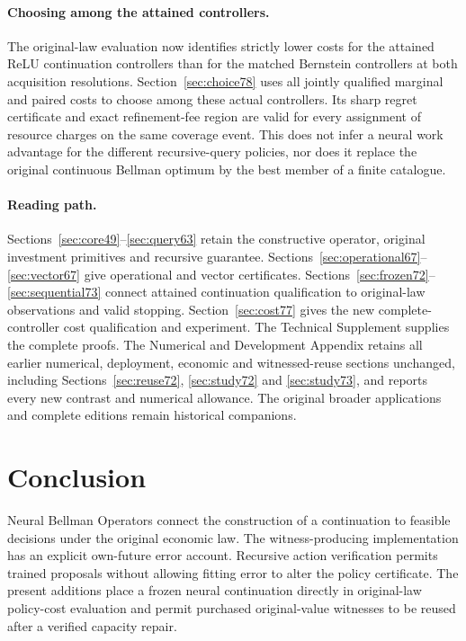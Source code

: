 \documentclass[ecta,nameyear,draft]{econsocart}
\begin{document}
\paragraph{Choosing among the attained controllers.}
The original-law evaluation now identifies strictly lower costs for the attained ReLU continuation controllers than for the matched Bernstein controllers at both acquisition resolutions. Section~\ref{sec:choice78} uses all jointly qualified marginal and paired costs to choose among these actual controllers. Its sharp regret certificate and exact refinement-fee region are valid for every assignment of resource charges on the same coverage event. This does not infer a neural work advantage for the different recursive-query policies, nor does it replace the original continuous Bellman optimum by the best member of a finite catalogue.

\paragraph{Reading path.}
Sections~\ref{sec:core49}--\ref{sec:query63} retain the constructive operator, original investment primitives and recursive guarantee. Sections~\ref{sec:operational67}--\ref{sec:vector67} give operational and vector certificates. Sections~\ref{sec:frozen72}--\ref{sec:sequential73} connect attained continuation qualification to original-law observations and valid stopping. Section~\ref{sec:cost77} gives the new complete-controller cost qualification and experiment. The Technical Supplement supplies the complete proofs. The Numerical and Development Appendix retains all earlier numerical, deployment, economic and witnessed-reuse sections unchanged, including Sections~\ref{sec:reuse72}, \ref{sec:study72} and \ref{sec:study73}, and reports every new contrast and numerical allowance. The original broader applications and complete editions remain historical companions.











\section{Conclusion}\label{sec:conclusion65}
Neural Bellman Operators connect the construction of a continuation to feasible decisions under the original economic law. The witness-producing implementation has an explicit own-future error account. Recursive action verification permits trained proposals without allowing fitting error to alter the policy certificate. The present additions place a frozen neural continuation directly in original-law policy-cost evaluation and permit purchased original-value witnesses to be reused after a verified capacity repair.
\end{document}
